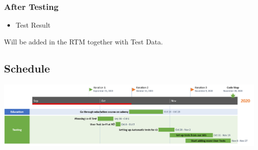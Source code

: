 \subsubsection{After Testing}
\begin{itemize}
    \item Test Result
  
\end{itemize}
Will be added in the RTM together with Test Data.
\subsection{Schedule}
\vfill
\includegraphics[width=\linewidth]{Pictures/TestSchedule.PNG}

    \vfill
    \clearpage
